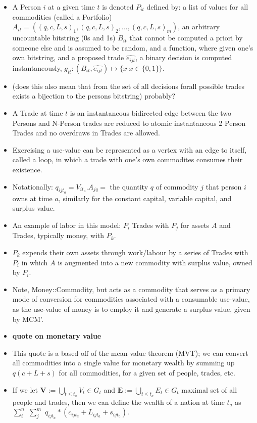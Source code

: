 \documentclass[12pt]{article}
\begin{document}
\begin{itemize}
    \item A Person $i$ at a given time $t$ is denoted $P_{it}$ defined by: a list of values for all commodities (called a Portfolio) $A_{it} = ((q, c, L, s)_{1}, (q, c, L, s)_{2},...,(q, c, L, s)_{m})$, an arbitrary uncountable bitstring (0s and 1s) $B_{it}$ that cannot be computed a priori by someone else and is assumed to be random, and a function, where given one's own bitstring, and a proposed trade $\hat{e_{ijt}}$, a binary decision is computed instantaneously, $g_{it} : (B_{it}, \hat{e_{ijt}}) \mapsto \{x | x \in  \{0, 1\}\}$. 
	\item (does this also mean that from the set of all decisions forall possible trades exists a bijection to the persons bitstring) probably? 
    \item A Trade at time $t$ is an instantaneous bidirected edge between the two Persons and N-Person trades are reduced to atomic instantaneous 2 Person Trades and no overdraws in Trades are allowed. 
    \item Exercising a use-value can be represented as a vertex with an edge to itself, called a loop, in which a trade with one's own commodites consumes their existence.
    \item Notationally: $q_{ijt_{a}} = V_{it_{a}}.A_{jq} =$ the quantity $q$ of commodity $j$ that person $i$ owns at time $a$, similarly for the constant capital, variable capital, and surplus value.
    \item An example of labor in this model: $P_i$ Trades with $P_j$ for assets $A$ and Trades, typically money, with $P_k$.
    \item $P_k$ expends their own assets through work/labour by a series of Trades with $P_i$ in which $A$ is augmented into a new commodity with surplus value, owned by $P_i$.  
    \item Note, Money::Commodity, but acts as a commodity that serves as a primary mode of conversion for commodities associated with a consumable use-value, as the use-value of money is to employ it and generate a surplus value, given by MCM'.
    \item \textbf{quote on monetary value}
    \item This quote is a based off of the mean-value theorem (MVT); we can convert all commodities into a single value for monetary wealth by summing up $q(c+L+s)$ for all commodities, for a given set of people, trades, etc.
    \item If we let $\boldsymbol{V} :=\bigcup\limits_{t \leq t_a} V_t \in G_t$ and $\boldsymbol{E} :=\bigcup\limits_{t \leq t_a} E_t \in G_t$ maximal set of all people and trades, then we can define the wealth of a nation at time $t_a$ as $\sum\limits_i^n$ $\sum\limits_j^m$ $q_{ijt_{a}} * (c_{ijt_{a}} + L_{ijt_{a}} + s_{ijt_{a}})$. 

\end{itemize}
\end{document}
